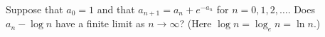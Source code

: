 Suppose that $a_0 = 1$ and that $a_{n+1} = a_n + e^{-a_n}$ for $n=0,1,2,\dots$. Does $a_n - \log n$
have a finite limit as $n \to \infty$? (Here $\log n = \log_e n = \ln n$.)
